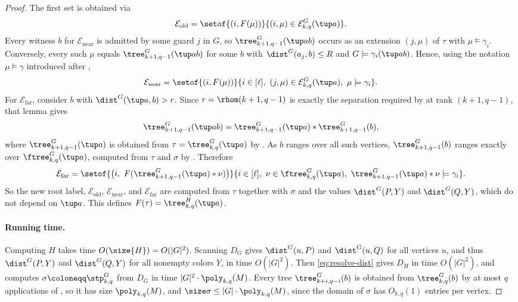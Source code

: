 \begin{proof}
The first set is obtained via
\[
\mathcal E_{\mathrm{old}}
=
\setof{(i,F(\mu))}{(i,\mu)\in\mathcal E^G_{k,q}(\tup a)}.
\]
Every witness $b$ for $\mathcal E_{\mathrm{near}}$ is admitted by some guard $j$ in $G$, so $\tree^G_{k+1,q-1}(\tup a b)$ occurs as an extension $(j,\mu)$ of $\tau$ with $\mu\models\gamma_i$.
Conversely, every such $\mu$ equals $\tree^G_{k+1,q-1}(\tup a b)$ for some $b$ with $\dist^G(a_j,b)\le R$ and $G\models\gamma_i(\tup a b)$.
Hence, using the notation $\mu\models\gamma$ introduced after ,
\[
\mathcal E_{\mathrm{near}}
=
\setof{(i,F(\mu))}{i\in[\ell],\ (j,\mu)\in\mathcal E^G_{k,q}(\tup a),\ \mu\models\gamma_i}.
\]
For $\mathcal E_{\mathrm{far}}$, consider $b$ with $\dist^G(\tup a,b)>r$.
Since $r=\rhom(k+1,q-1)$ is exactly the separation required by  at rank $(k+1,q-1)$, that lemma
gives
\[
\tree^G_{k+1,q-1}(\tup a b)
=
\tree^G_{k+1,q-1}(\tup a)\ast\tree^G_{k+1,q-1}(b),
\]
where $\tree^G_{k+1,q-1}(\tup a)$ is obtained from $\tau=\tree^G_{k,q}(\tup a)$ by .
As $b$ ranges over all such vertices, $\tree^G_{k+1,q-1}(b)$ ranges exactly over $\ftree^G_{k,q}(\tup a)$, computed from $\tau$ and $\sigma$ by .
Therefore
\[
\mathcal E_{\mathrm{far}}
=
\setof{\bigl(i,\ F(\tree^G_{k+1,q-1}(\tup a)\ast\nu)\bigr)}{i\in[\ell],\ \nu\in\ftree^G_{k,q}(\tup a),\ \tree^G_{k+1,q-1}(\tup a)\ast\nu\models\gamma_i}.
\]
So the new root label, $\mathcal E_{\mathrm{old}}$, $\mathcal E_{\mathrm{near}}$, and $\mathcal E_{\mathrm{far}}$ are computed from $\tau$ together with $\sigma$ and the values $\dist^G(P,Y)$ and $\dist^G(Q,Y)$, which do not depend on $\tup a$. This defines $F(\tau)=\tree^{H}_{k,q}(\tup a)$.

\paragraph{Running time.}
Computing $H$ takes time $O(\size{H})=O(|G|^2)$.
Scanning $D_G$ gives $\dist^G(u,P)$ and $\dist^G(u,Q)$ for all vertices $u$, and thus $\dist^G(P,Y)$ and $\dist^G(Q,Y)$ for all nonempty colors $Y$, in time $O(|G|^2)$.
Then \eqref{eq:resolve-dist} gives $D_H$ in time $O(|G|^2)$, and  computes $\sigma\coloneqq\stp^G_{k,q}$ from $D_G$ in time $|G|^2\cdot\poly_{k,q}(M)$.
Every tree $\tree^G_{k+i,q-i}(b)$ is obtained from $\tree^G_{k,q}(b)$ by at most $q$ applications of , so it has size $\poly_{k,q}(M)$, and $\size\sigma\le |G|\cdot\poly_{k,q}(M)$, since the domain of $\sigma$ has $O_{k,q}(1)$ entries per vertex.


\end{proof}
